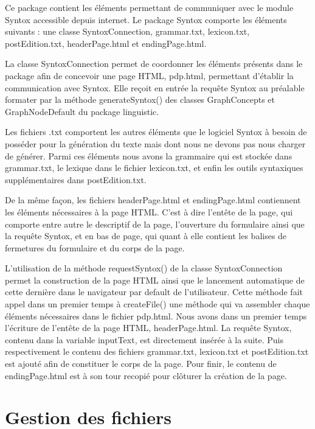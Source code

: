 \documentclass[12pt]{report}
\begin{document}
Ce package contient les éléments permettant de communiquer avec le module Syntox accessible depuis internet. Le package Syntox comporte les éléments suivants : une classe SyntoxConnection, grammar.txt, lexicon.txt, postEdition.txt, headerPage.html et endingPage.html.

\bigskip
La classe SyntoxConnection permet de coordonner les éléments présents dans le package afin de concevoir une page HTML, pdp.html, permettant d'établir la communication avec Syntox. Elle reçoit en entrée la requête Syntox au préalable formater par la méthode generateSyntox() des classes GraphConcepts et GraphNodeDefault du package linguistic. 

\bigskip
Les fichiers .txt comportent les autres éléments que le logiciel Syntox à besoin de posséder pour la génération du texte mais dont nous ne devons pas nous charger de générer. Parmi ces éléments nous avons la grammaire qui est stockée dans grammar.txt, le lexique dans le fichier lexicon.txt, et enfin les outils syntaxiques supplémentaires dans postEdition.txt. 

\bigskip
De la même façon, les fichiers headerPage.html et endingPage.html contiennent les éléments nécessaires à la page HTML. C'est à dire l'entête de la page, qui comporte entre autre le descriptif de la page, l'ouverture du formulaire ainsi que la requête Syntox, et en bas de page, qui quant à elle contient les balises de fermetures du formulaire et du corps de la page. 

\bigskip
L'utilisation de la méthode requestSyntox() de la classe SyntoxConnection permet la construction de la page HTML ainsi que le lancement automatique de cette dernière dans le navigateur par default de l'utilisateur. Cette méthode fait appel dans un premier temps à createFile() une méthode qui va assembler chaque éléments nécessaires dans le fichier pdp.html. Nous avons dans un premier temps l'écriture de l'entête de la page HTML, headerPage.html. La requête Syntox, contenu dans la variable inputText, est directement insérée à la suite. Puis respectivement le contenu des fichiers grammar.txt, lexicon.txt et postEdition.txt est ajouté afin de constituer le corps de la page. Pour finir, le contenu de endingPage.html est à son tour recopié pour clôturer la création de la page. 

   


\section{Gestion des fichiers}
\end{document}
